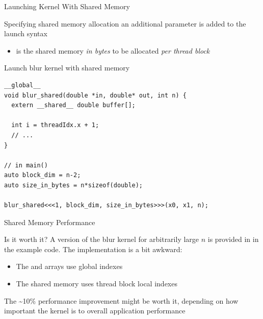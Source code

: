 \begin{frame}[fragile]{Launching Kernel With Shared Memory}
    \begin{info}{Specifying shared memory allocation}
        an additional parameter is added to the launch syntax\\
        \centering {}
        \begin{itemize}
            \item {} is the shared memory \emph{in bytes} to be allocated \emph{per thread block}
        \end{itemize}
    \end{info}

    \begin{code}{Launch blur kernel with shared memory}
        \begin{lstlisting}[style=boxcudatiny]
__global__
void blur_shared(double *in, double* out, int n) {
  extern __shared__ double buffer[];

  int i = threadIdx.x + 1;
  // ...
}

// in main()
auto block_dim = n-2;
auto size_in_bytes = n*sizeof(double);

blur_shared<<<1, block_dim, size_in_bytes>>>(x0, x1, n);
        \end{lstlisting}
    \end{code}

\end{frame}

\begin{frame}[fragile]{Shared Memory Performance}
    \begin{info}{Is it worth it?}
        A version of the blur kernel for arbitrarily large $n$ is provided in  in the example code. The implementation is a bit awkward:
        \begin{itemize}
            \item  The  and  arrays use global indexes
            \item  The shared memory uses thread block local indexes
        \end{itemize}
        The \textasciitilde10\% performance improvement might be worth it, depending on how important the kernel is to overall application performance
    \end{info}

\end{frame}

